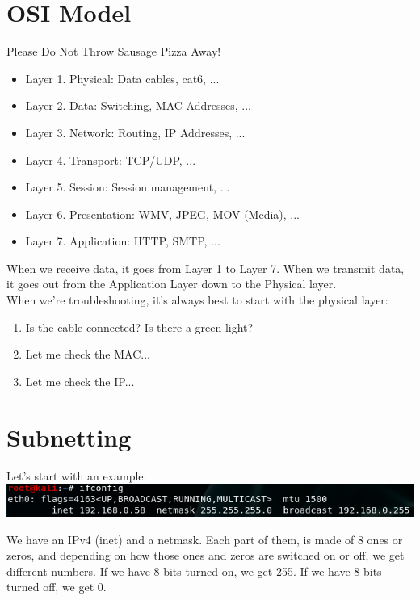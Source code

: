 \documentclass[11pt,a4paper]{article}
\begin{document}
\section{OSI Model}
Please Do Not Throw Sausage Pizza Away!
\begin{itemize}
\item Layer 1. Physical: Data cables, cat6, ...
\item Layer 2. Data: Switching, MAC Addresses, ...
\item Layer 3. Network: Routing, IP Addresses, ...
\item Layer 4. Transport: TCP/UDP, ...
\item Layer 5. Session: Session management, ...
\item Layer 6. Presentation: WMV, JPEG, MOV (Media), ...
\item Layer 7. Application: HTTP, SMTP, ...
\end{itemize}
When we receive data, it goes from Layer 1 to Layer 7. When we transmit data, it goes out from the Application Layer down to the Physical layer. \\

When we're troubleshooting, it's always best to start with the physical layer:
\begin{enumerate}
\item Is the cable connected? Is there a green light?
\item Let me check the MAC...
\item Let me check the IP...
\end{enumerate}

\section{Subnetting}
Let's start with an example:\\

\includegraphics[scale=.70]{ifconfig.png} 

We have an IPv4 (inet) and a netmask. Each part of them, is made of 8 ones or zeros, and depending on how those ones and zeros are switched on or off, we get different numbers. If we have 8 bits turned on, we get 255. If we have 8 bits turned off, we get 0.\\
\end{document}
